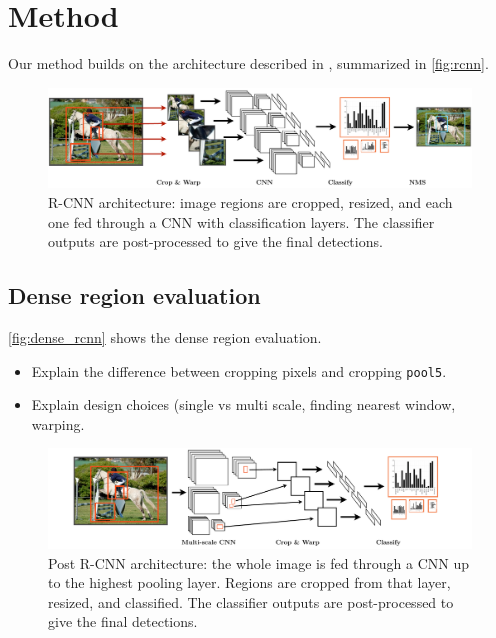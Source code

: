 \section{Method}\label{method}

Our method builds on the architecture described in \cite{Girshick2014}, summarized in \autoref{fig:rcnn}.

\begin{figure}[h!]
\begin{center}
\includegraphics[width=0.98\columnwidth]{figures/rcnn.pdf}
\caption{
R-CNN architecture: image regions are cropped, resized, and each one fed through a CNN with classification layers.
The classifier outputs are post-processed to give the final detections.
}\label{fig:rcnn}
\end{center}
\end{figure}

\subsection{Dense region evaluation}\label{dense-region-evaluation}

\autoref{fig:dense_rcnn} shows the dense region evaluation.

\begin{itemize}
\itemsep1pt\parskip0pt
\item
  Explain the difference between cropping pixels and cropping \texttt{pool5}.
\item
  Explain design choices (single vs multi scale, finding nearest window, warping.
\end{itemize}

\begin{figure}[h!]
\begin{center}
\includegraphics[width=0.98\columnwidth]{figures/dense_rcnn.pdf}
\caption{
Post R-CNN architecture: the whole image is fed through a CNN up to the highest pooling layer.
Regions are cropped from that layer, resized, and classified.
The classifier outputs are post-processed to give the final detections.
}\label{fig:dense_rcnn}
\end{center}
\end{figure}

